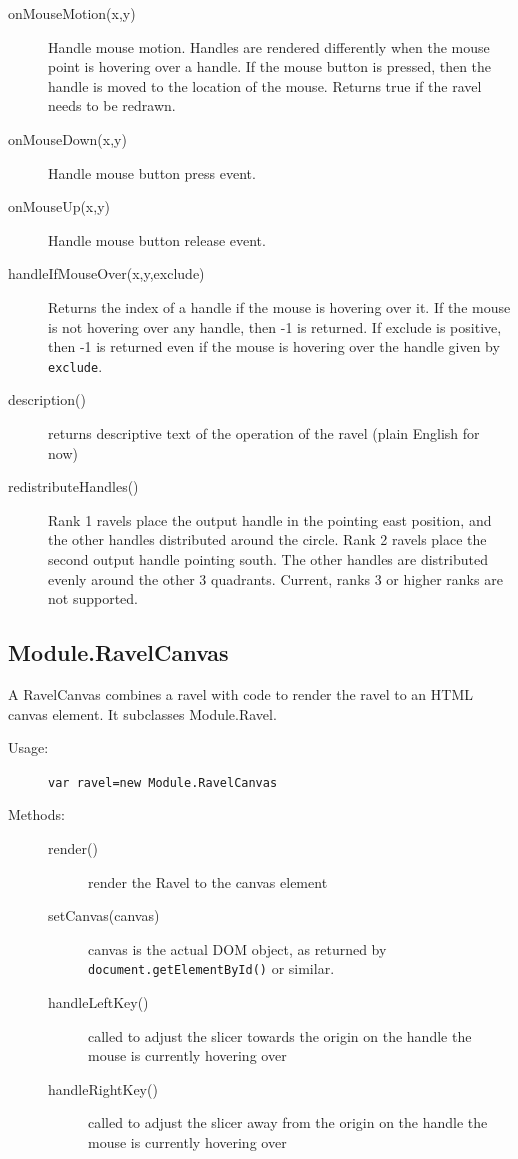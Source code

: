 \documentclass{article}
\begin{document}
\begin{description}
\begin{description}
  \item[onMouseMotion(x,y)] Handle mouse motion. Handles are rendered
    differently when the mouse point is hovering over a
    handle. If the mouse button is pressed, then the handle is moved
    to the location of the mouse. Returns true if the ravel needs to be redrawn.
  \item[onMouseDown(x,y)] Handle mouse button press event.
  \item[onMouseUp(x,y)] Handle mouse button release event.
    
  \item[handleIfMouseOver(x,y,exclude)] Returns the index of a handle if
    the mouse is hovering over it. If the mouse is not hovering over any
    handle, then -1 is returned. If exclude is positive, then -1 is
    returned even if the mouse is hovering over the handle given by {\tt
      exclude}.

  \item[description()] returns descriptive text of the operation of the
    ravel (plain English for now)
    
  \item[redistributeHandles()] Rank 1 ravels place the output handle in
    the pointing east position, and the other handles distributed around
    the circle. Rank 2 ravels place the second output handle pointing
    south. The other handles are distributed evenly around the other 3
    quadrants. Current, ranks 3 or higher ranks are not supported.
    
  \end{description} 
\end{description} 

\subsection{Module.RavelCanvas}

A RavelCanvas combines a ravel with code to render the ravel to an
HTML canvas element. It subclasses Module.Ravel.

\begin{description}
\item[Usage:] \verb+var ravel=new Module.RavelCanvas+

\item[Methods:]\mbox{}
\begin{description}
\item[render()] render the Ravel to the canvas element
\item[setCanvas(canvas)] canvas is the actual DOM object, as returned
  by {\tt document.getElementById()} or similar.
\item[handleLeftKey()] called to adjust the slicer towards the origin
  on the handle the mouse is currently hovering over
\item[handleRightKey()] called to adjust the slicer away from the origin
  on the handle the mouse is currently hovering over
\end{description}
\end{description}
\end{document}
